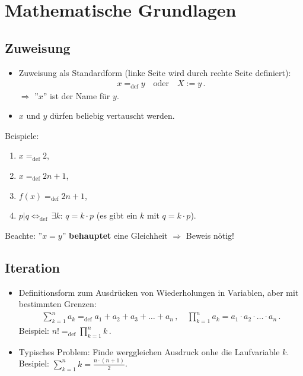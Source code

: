 \documentclass[12pt]{book}													%
\newcommand{\bma}{\begin{eqnarray}}
\newcommand{\ema}{\end{eqnarray}\hspace{-0.015cm}}
\newcommand{\Def}{_{\text{def}}}
\begin{document}
\thispagestyle{empty}
\setlength{\parindent}{0pt}
\vspace{2.5cm}
{\bf \fontsize{36}{36} \selectfont {Diskrete Mathematik und }}\\[5mm]
{\bf \fontsize{36}{36} \selectfont {Logik}}\\[1cm]
{\fontsize{14}{18} \selectfont  {Universität Konstanz, Wintersemester 2022/23}}\\[1cm]
{\fontsize{18}{22} \selectfont  {Dozent: Prof.\ Dr.\ Sven Kosub}}\\[.5cm]
{\fontsize{18}{22} \selectfont  {Ausarbeitung: Dr.\ Matthias Droth}}\\[.5cm]
\newpage
\thispagestyle{empty}
\setcounter{secnumdepth}{2}
\setcounter{tocdepth}{3}
\tableofcontents
\setlength{\parindent}{0.0cm}			%
\parskip=0.3cm						%
\chapter{Mathematische Grundlagen}
%
\section{Zuweisung}
\begin{itemize}
\item Zuweisung als Standardform (linke Seite wird durch rechte Seite definiert):
\bma
x=\Def y\quad\text{oder}\quad X:=y\,.
\ema
$\Rightarrow$ ''$x$'' ist der Name für $y$.
\item $x$ und $y$ dürfen beliebig vertauscht werden.
\end{itemize}
Beispiele:
\begin{enumerate}
\item $x=\Def2$,
\item $x=\Def 2n+1$,
\item $f(x)=\Def 2n+1$,
\item $p|q\Leftrightarrow\Def\,\exists k:\,q=k\cdot p$ (es gibt ein $k$ mit $q=k\cdot p$).
\end{enumerate}
Beachte: ''$x=y$'' \textbf{behauptet} eine Gleichheit $\Rightarrow$ Beweis nötig!
%
\section{Iteration}
\begin{itemize}
\item Definitionsform zum Ausdrücken von Wiederholungen in Variablen, aber mit bestimmten Grenzen:
\bma
\sum_{k=1}^na_k=\Def a_1+a_2+a_3+\ldots+a_n\,,\quad\prod_{k=1}^na_k=a_1\cdot a_2\cdot\ldots\cdot a_n\,.
\ema
Beispiel: $n!=\Def\prod_{k=1}^nk\,$.
\item Typisches Problem: Finde werggleichen Ausdruck onhe die Laufvariable $k$.\\Besipiel: $\sum_{k=1}^nk=\frac{n\cdot(n+1)}{2}$. 
\end{itemize}
%
\end{document}
